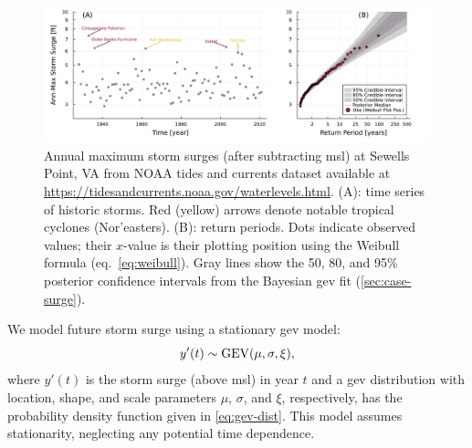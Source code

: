 \documentclass[11pt]{article}
\begin{document}
\begin{figure}
    \centering
    \includegraphics[width=\textwidth]{surge-obs-return}
    \caption{
        Annual maximum storm surges (after subtracting \acrlong{msl}) at Sewells Point, VA from NOAA tides and currents dataset available at \url{https://tidesandcurrents.noaa.gov/waterlevels.html}.
        (A):
        time series of historic storms.
        Red (yellow) arrows denote notable tropical cyclones (Nor'easters).
        (B):
        return periods.
        Dots indicate observed values; their $x$-value is their plotting position using the Weibull formula (eq.~\ref{eq:weibull}).
        Gray lines show the 50, 80, and 95\% posterior confidence intervals from the Bayesian \gls{gev} fit (\cref{sec:case-surge}).
    }\label{fig:surge-obs-return}
\end{figure}

We model future storm surge using a stationary \gls{gev} model:
\begin{equation}\label{eq:surge-model}
    y'(t) \sim \text{GEV}\qty(\mu, \sigma, \xi),
\end{equation}
where $y'(t)$ is the storm surge (above \gls{msl}) in year $t$ and a \gls{gev} distribution with location, shape, and scale parameters $\mu$, $\sigma$, and $\xi$, respectively, has the probability density function given in \cref{eq:gev-dist}.
This model assumes stationarity, neglecting any potential time dependence.
\end{document}
